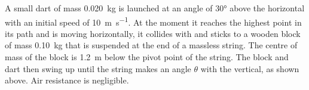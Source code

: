 \documentclass{../../../oss-apphys-exam}
\newcounter{lastmc}
\begin{document}
\begin{questions}    
  \setcounter{question}{\value{lastmc}}
  
  \question A small dart of mass \SI{.020}{\kilo\gram} is launched at an angle
  of \ang{30} above the horizontal with an initial speed of
  \SI{10}{\meter\per\second}. At the moment it reaches the highest point in its
  path and is moving horizontally, it collides with and sticks to a wooden
  block of mass \SI{.10}{\kilo\gram} that is suspended at the end of a massless
  string. The centre of mass of the block is \SI{1.2}{\metre} below the pivot
  point of the string. The block and dart then swing up until the string makes
  an angle $\theta$ with the vertical, as shown above. Air resistance is
  negligible.
\end{questions}
\end{document}
